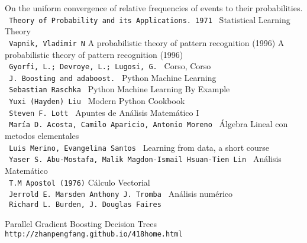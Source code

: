 \documentclass[a4paper,11pt]{book}
\begin{document}



\setlength{\parskip}{5pt}











\begin{thebibliography}{1}

On the uniform convergence of relative frequencies of events to their probabilities.
\\\texttt{ Theory of Probability and its Applications. 1971 }
Statistical Learning Theory
\\\texttt{ Vapnik, Vladimir N}
\bibitem
{ A probabilistic theory of pattern recognition (1996) }
A probabilistic theory of pattern recognition (1996)
\\\texttt{ Gyorfi, L.; Devroye, L.; Lugosi, G. }
\bibitem
{Corso, } Corso
\\\texttt{ J. Boosting and adaboost. }
Python Machine Learning
\\\texttt{ Sebastian Raschka }
Python Machine Learning By Example
\\\texttt{ Yuxi (Hayden) Liu }
Modern Python Cookbook
\\\texttt{ Steven F. Lott }
Apuntes de Análisis Matemático I
\\\texttt{ María D. Acosta, Camilo Aparicio, Antonio Moreno }
Álgebra Lineal con metodos elementales
\\\texttt{ Luis Merino, Evangelina Santos }
Learning from data, a short course
\\\texttt{ Yaser S. Abu-Mostafa, Malik Magdon-Ismail Hsuan-Tien Lin }
Análisis Matemático
\\\texttt{ T.M Apostol (1976)}
Cálculo Vectorial
\\\texttt{ Jerrold E. Marsden
Anthony J. Tromba }
Análisis numérico
\\\texttt{ Richard L. Burden, J. Douglas Faires }

Parallel Gradient Boosting Decision Trees
\\\texttt{http://zhanpengfang.github.io/418home.html}


\end{thebibliography}
\end{document}
